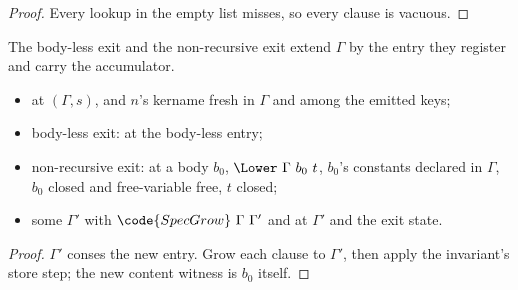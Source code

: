 \begin{proof}
\leanok
{}
 Every lookup in the empty list misses, so every clause is vacuous.
\end{proof}
\begin{lemma}
\label{lem:regInv_constCons_step}
\leanok
{}
 The body-less exit and the non-recursive exit extend $\Gamma$ by the entry they register
and carry the accumulator.
\begin{itemize}
\item {}  at $(\Gamma, s)$, and $n$'s kername fresh in $\Gamma$ and among the
emitted keys;
\item body-less exit:  at the body-less entry;
\item non-recursive exit:  at a body $b_0$, $\Lower\ \Gamma\ b_0\ t$, $b_0$'s constants
declared in $\Gamma$, $b_0$ closed and free-variable free, $t$ closed;
\item {} some $\Gamma'$ with $\code{SpecGrow}\ \Gamma\ \Gamma'$ and  at $\Gamma'$ and
the exit state.
\end{itemize}
\end{lemma}
\begin{proof}
\leanok
{}
 $\Gamma'$ conses the new entry. Grow each clause to $\Gamma'$, then apply the invariant's store
step; the new content witness is $b_0$ itself.
\end{proof}
